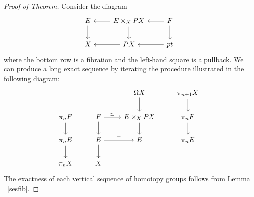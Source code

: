\documentclass{article}
\newtheorem{proposed work}[theorem]{Proposed Work}
\begin{document}
\begin{proof}[Proof of Theorem]
Consider the diagram
\[
\begin{tikzcd}
E \arrow[d] & E \times_X PX \arrow[l] \arrow[d] & F \arrow[l] \arrow[d] \\
X  & PX \arrow[l] & pt \arrow[l]
\end{tikzcd}
\]
where the bottom row is a fibration and the left-hand square is a pullback. We can  produce a long exact sequence by iterating the procedure illustrated in the following diagram:
\[
\begin{tikzcd}
& & \Omega X  \arrow[d] & \pi_{n+1}X \arrow[d] \\
\pi_n F \arrow[d]  & F \arrow[d] \arrow[r,"\simeq"] & E \times_X PX \arrow{d} & \pi_n F \arrow[d] \\
\pi_n E \arrow[d] & E  \arrow[d] \arrow[r,"="]& E & \pi_n E \\
\pi_n X & X
\end{tikzcd}
\]
The exactness of each vertical sequence of homotopy groups follows from Lemma ~\ref{sesfib}. 
\end{proof}
\end{document}
